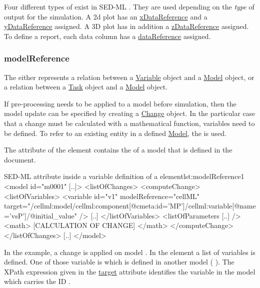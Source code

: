 Four different types of  exist in SED-ML \LoneVone. They are used depending on the \emph{type} of output for the simulation. A 2d plot has an \hyperref[sec:xDataReference]{xDataReference} and a \hyperref[sec:yDataReference]{yDataReference} assigned. A 3D plot has in addition a \hyperref[sec:zDataReference]{zDataReference} assigned. To define a report, each data column has a \hyperref[sec:dataReference1]{dataReference} assigned.

\subsubsection{modelReference}
\label{sec:modelReference}
%
The  either represents a relation between a \hyperref[class:variable]{Variable} object and a \hyperref[class:Model]{Model} object, or  a relation between a \hyperref[class:task]{Task} object and a \hyperref[class:Model]{Model} object.

If pre-processing needs to be applied to a model before simulation, then the model update can be specified by creating a \hyperref[class:Change]{Change} object. In the particular case that a change must be calculated with a mathematical function, variables need to be defined. To refer to an existing entity in a defined \hyperref[class:model]{Model}, the  is used. 

The  attribute of the  element contains the  of a model that is defined in the document. 
%
\begin{myXmlLst}{SED-ML  attribute inside a variable definition of a   element}{lst:modelReference1}
<model id="m0001" [..]>
 <listOfChanges>
   <computeChange>
    <listOfVariables>
     <variable id="v1" modelReference="cellML" target="/cellml:model/cellml:component[@cmeta:id='MP']/cellml:variable[@name='vsP']/@initial_value" />
     [..]
    </listOfVariables>
    <listOfParameters [..] />
    <math>
     [CALCULATION OF CHANGE]
    </math>
   </computeChange>
 </listOfChanges>
 [..]
</model>
\end{myXmlLst}
%
In the example, a change is  applied on model . In the  element a list of variables is defined. One of those variable is  which is defined in another model ( ). 
The XPath expression given in the \hyperref[sec:target]{target} attribute identifies the variable in the model which carries the ID .

